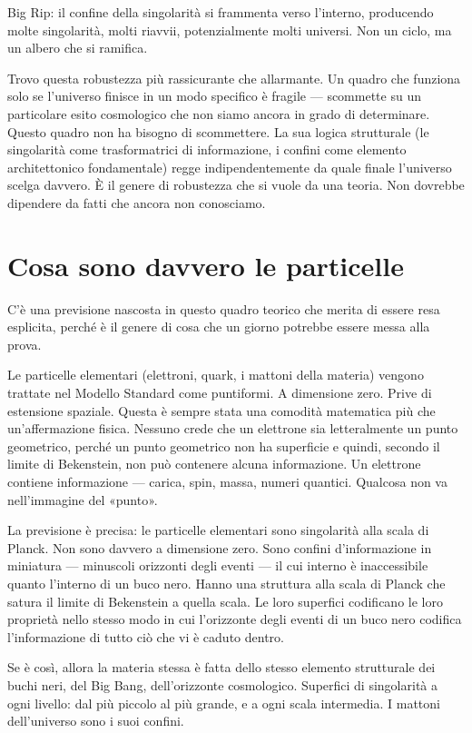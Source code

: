 \documentclass[11pt, twoside, openright]{book}
\begin{document}
Big Rip: il confine della singolarità si frammenta verso l'interno, producendo molte singolarità, molti riavvii, potenzialmente molti universi. Non un ciclo, ma un albero che si ramifica.

Trovo questa robustezza più rassicurante che allarmante. Un quadro che funziona solo se l'universo finisce in un modo specifico è fragile --- scommette su un particolare esito cosmologico che non siamo ancora in grado di determinare. Questo quadro non ha bisogno di scommettere. La sua logica strutturale (le singolarità come trasformatrici di informazione, i confini come elemento architettonico fondamentale) regge indipendentemente da quale finale l'universo scelga davvero. È il genere di robustezza che si vuole da una teoria. Non dovrebbe dipendere da fatti che ancora non conosciamo.


\section*{Cosa sono davvero le particelle}

C'è una previsione nascosta in questo quadro teorico che merita di essere resa esplicita, perché è il genere di cosa che un giorno potrebbe essere messa alla prova.

Le particelle elementari (elettroni, quark, i mattoni della materia) vengono trattate nel Modello Standard come puntiformi. A dimensione zero. Prive di estensione spaziale. Questa è sempre stata una comodità matematica più che un'affermazione fisica. Nessuno crede che un elettrone sia letteralmente un punto geometrico, perché un punto geometrico non ha superficie e quindi, secondo il limite di Bekenstein, non può contenere alcuna informazione. Un elettrone contiene informazione --- carica, spin, massa, numeri quantici. Qualcosa non va nell'immagine del «punto».

La previsione è precisa: le particelle elementari sono singolarità alla scala di Planck. Non sono davvero a dimensione zero. Sono confini d'informazione in miniatura --- minuscoli orizzonti degli eventi --- il cui interno è inaccessibile quanto l'interno di un buco nero. Hanno una struttura alla scala di Planck che satura il limite di Bekenstein a quella scala. Le loro superfici codificano le loro proprietà nello stesso modo in cui l'orizzonte degli eventi di un buco nero codifica l'informazione di tutto ciò che vi è caduto dentro.

Se è così, allora la materia stessa è fatta dello stesso elemento strutturale dei buchi neri, del Big Bang, dell'orizzonte cosmologico. Superfici di singolarità a ogni livello: dal più piccolo al più grande, e a ogni scala intermedia. I mattoni dell'universo sono i suoi confini.
\end{document}
